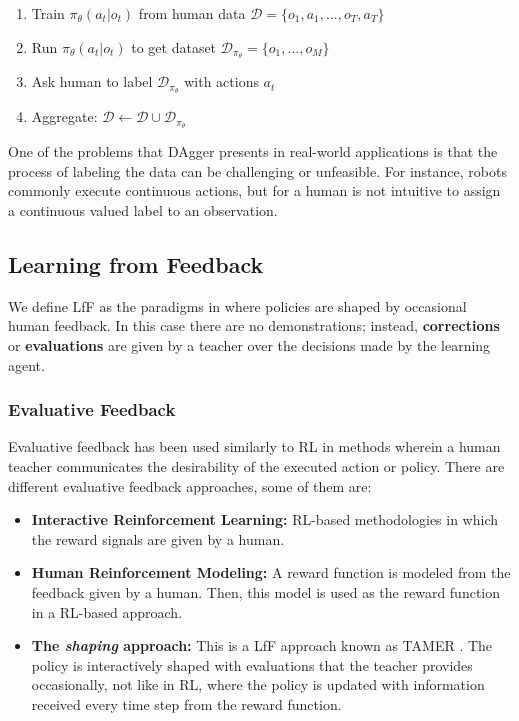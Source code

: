 \begin{enumerate}
    \item Train $\pi_{\theta}(a_{t}|o_{t})$ from human data $\mathcal{D}=\{o_{1},a_{1},...,o_{T},a_{T}\}$
    \item Run $\pi_{\theta}(a_{t}|o_{t})$ to get dataset $\mathcal{D}_{\pi_{\theta}}=\{o_{1},...,o_{M}\}$
    \item Ask human to label $\mathcal{D}_{\pi_{\theta}}$ with actions $a_{t}$
    \item Aggregate: $\mathcal{D} \leftarrow \mathcal{D} \cup \mathcal{D_{\pi_{\theta}}}$
\end{enumerate}

One of the problems that DAgger presents in real-world applications is that the process of labeling the data can be challenging or unfeasible. For instance, robots commonly execute continuous actions, but for a human is not intuitive to assign a continuous valued label to an observation.

\subsection{Learning from Feedback}

We define LfF as the paradigms in where policies are shaped by occasional human feedback. In this case there are no demonstrations; instead, \textbf{corrections} or \textbf{evaluations} are given by a teacher over the decisions made by the learning agent.

\subsubsection{Evaluative Feedback}

Evaluative feedback has been used similarly to RL in methods wherein a human teacher communicates the desirability of the executed action or policy. There are different evaluative feedback approaches, some of them are:

\begin{itemize}
    \item \textbf{Interactive Reinforcement Learning:} RL-based methodologies in which the reward signals are given by a human.
    \item \textbf{Human Reinforcement Modeling:} A reward function is modeled from the feedback given by a human. Then, this model is used as the reward function in a RL-based approach.
    \item \textbf{The \emph{shaping} approach:} This is a LfF approach known as TAMER \cite{Knox:2009:ISA:1597735.1597738}. The policy is interactively shaped with evaluations that the teacher provides occasionally, not like in RL, where the policy is updated with information received every time step from the reward function.
\end{itemize}


